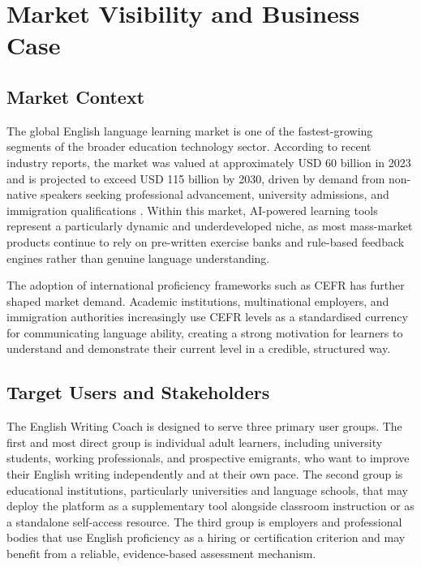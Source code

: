 \documentclass[12pt, a4paper]{report}
\begin{document}
\chapter{Market Visibility and Business Case}
\label{ch:market}

\section{Market Context}

The global English language learning market is one of the fastest-growing segments of the broader education technology sector. According to recent industry reports, the market was valued at approximately USD 60 billion in 2023 and is projected to exceed USD 115 billion by 2030, driven by demand from non-native speakers seeking professional advancement, university admissions, and immigration qualifications \cite{grandview2023}. Within this market, AI-powered learning tools represent a particularly dynamic and underdeveloped niche, as most mass-market products continue to rely on pre-written exercise banks and rule-based feedback engines rather than genuine language understanding.

The adoption of international proficiency frameworks such as CEFR has further shaped market demand. Academic institutions, multinational employers, and immigration authorities increasingly use CEFR levels as a standardised currency for communicating language ability, creating a strong motivation for learners to understand and demonstrate their current level in a credible, structured way.

\section{Target Users and Stakeholders}

The English Writing Coach is designed to serve three primary user groups. The first and most direct group is individual adult learners, including university students, working professionals, and prospective emigrants, who want to improve their English writing independently and at their own pace. The second group is educational institutions, particularly universities and language schools, that may deploy the platform as a supplementary tool alongside classroom instruction or as a standalone self-access resource. The third group is employers and professional bodies that use English proficiency as a hiring or certification criterion and may benefit from a reliable, evidence-based assessment mechanism.
\end{document}
